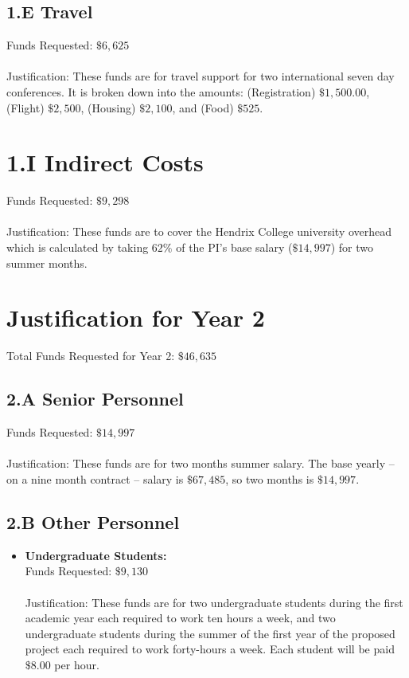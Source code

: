 \documentclass[11pt]{article}
\begin{document}
\subsection*{1.E Travel}
\label{subsec:travel}
Funds Requested: $\$6,625$\\ \ \\ Justification: These funds are for
travel support for two international seven day conferences. It is
broken down into the amounts: (Registration) $\$1,500.00$, (Flight)
$\$2,500$, (Housing) $\$2,100$, and (Food) $\$525$.

\section*{1.I Indirect Costs}
\label{sec:1.i_indirect_costs}
Funds Requested: $\$9,298$\\ \ \\ Justification: These funds are to
cover the Hendrix College university overhead which is calculated by
taking $62\%$ of the PI's base salary ($\$14,997$) for two summer
months.

\section{Justification for Year 2}
\label{sec:justification_for_year_2}
Total Funds Requested for Year 2: $\$46,635$\\
\vspace{-20px}
\subsection*{2.A Senior Personnel}
\label{subsec:a_senior_personnel}

Funds Requested: $\$14,997$\\ \ \\ Justification: These funds are for
two months summer salary. The base yearly -- on a nine month contract
-- salary is $\$67,485$, so two months is $\$14,997$.  

\subsection*{2.B Other Personnel}
\label{subsec:personnel}
\begin{itemize}

\item \textbf{Undergraduate Students:}\\ Funds Requested:
  $\$9,130$\\ \ \\ Justification: These funds are for two
  undergraduate students during the first academic year each required
  to work ten hours a week, and two undergraduate students during the
  summer of the first year of the proposed project each required to
  work forty-hours a week.  Each student will be paid $\$8.00$ per
  hour.
\end{itemize}
\end{document}
